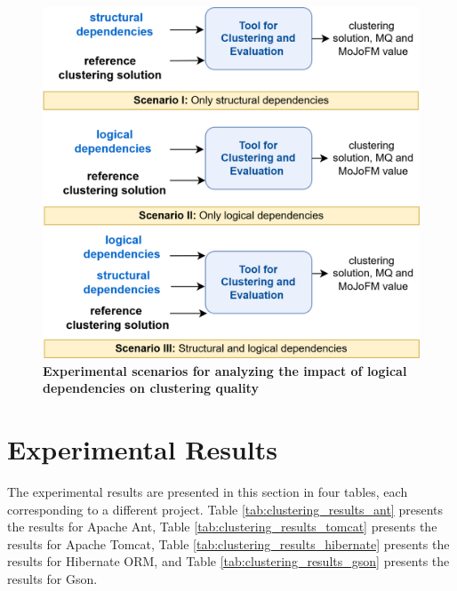 \documentclass{ieeeaccess}
\begin{document}
\begin{figure}[t!]
  \centering
  \includegraphics[width=\columnwidth]{scenario.png}
  \caption{ \textbf{Experimental scenarios for analyzing the impact of logical dependencies on clustering quality}}
  \label{fig:scenatrio}
\end{figure}


\section{Experimental Results}
\label{sec:results}

The experimental results are presented in this section in four tables, each corresponding to a different project. Table \ref{tab:clustering_results_ant} presents the results for Apache Ant, Table \ref{tab:clustering_results_tomcat} presents the results for Apache Tomcat, Table \ref{tab:clustering_results_hibernate} presents the results for Hibernate ORM, and Table \ref{tab:clustering_results_gson} presents the results for Gson.
\end{document}
